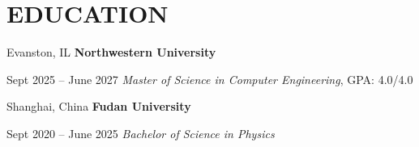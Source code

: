     \section{EDUCATION}
 
        \begin{twocolentry}{
            Evanston, IL
        }
            {\ResumeEntryTitleFont\textbf{Northwestern University}}
        \end{twocolentry}
        \begin{twocolentry}{
            Sept 2025 – June 2027
        }
            \textit{Master of Science in Computer Engineering}, GPA: 4.0/4.0
        \end{twocolentry}

        \vspace{0.10 cm}
 
        \begin{twocolentry}{
            Shanghai, China
        }
            {\ResumeEntryTitleFont\textbf{Fudan University}}
        \end{twocolentry}
        \begin{twocolentry}{
            Sept 2020 – June 2025
        }
            \textit{Bachelor of Science in Physics}
        \end{twocolentry}
